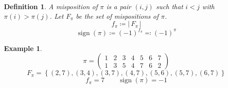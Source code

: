 \documentclass[a4paper,landscape,twocolumn]{article}
\newcommand\set[1]{\left\{#1\right\}}
\newcommand\card[1]{\left|\,#1\,\right|}
\newtheorem{defi}{Definition}
\newtheorem{ex}{Example}
\begin{document}
\begin{defi}
  \label{def-7.14}
  A \emph{misposition} of $\pi$ is a pair $(i,j)$ such that
  $i < j$ with $\pi(i) > \pi(j)$.
  Let $F_\pi$ be the set of mispositions of $\pi$.
  \[ f_{\pi} \coloneqq \card{F_\pi} \]
  \[ \operatorname{sign}(\pi) \coloneqq (-1)^{f_\pi} \eqqcolon (-1)^\pi \]
\end{defi}

\begin{ex}
  \label{example-7.15}
  \[
    \pi = \begin{pmatrix}
      1 & 2 & 3 & 4 & 5 & 6 & 7 \\
      1 & 3 & 5 & 4 & 7 & 6 & 2
    \end{pmatrix}
  \] \[
    F_\pi = \set{(2,7), (3,4), (3,7), (4,7), (5,6), (5,7), (6,7)}
  \]
  \[ f_\pi = 7 \qquad \operatorname{sign}(\pi) = -1 \]
\end{ex}

\clearpage
\begin{otherlanguage}{ngerman}
\printindex[German]
\end{otherlanguage}
\printindex[English]
\end{document}
